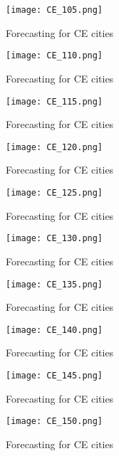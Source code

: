  \begin{figure}[!ht] 
 \centering 
 \texttt{[image: CE\_105.png]} 
 \caption{Forecasting for CE cities } 
 \label{fig:CE_105} 
 \end{figure} 
 
 \begin{figure}[!ht] 
 \centering 
 \texttt{[image: CE\_110.png]} 
 \caption{Forecasting for CE cities } 
 \label{fig:CE_110} 
 \end{figure} 
 
 \begin{figure}[!ht] 
 \centering 
 \texttt{[image: CE\_115.png]} 
 \caption{Forecasting for CE cities } 
 \label{fig:CE_115} 
 \end{figure} 
 
 \begin{figure}[!ht] 
 \centering 
 \texttt{[image: CE\_120.png]} 
 \caption{Forecasting for CE cities } 
 \label{fig:CE_120} 
 \end{figure} 
 
 \begin{figure}[!ht] 
 \centering 
 \texttt{[image: CE\_125.png]} 
 \caption{Forecasting for CE cities } 
 \label{fig:CE_125} 
 \end{figure} 
 
 \begin{figure}[!ht] 
 \centering 
 \texttt{[image: CE\_130.png]} 
 \caption{Forecasting for CE cities } 
 \label{fig:CE_130} 
 \end{figure} 
 
 \begin{figure}[!ht] 
 \centering 
 \texttt{[image: CE\_135.png]} 
 \caption{Forecasting for CE cities } 
 \label{fig:CE_135} 
 \end{figure} 
 
 \begin{figure}[!ht] 
 \centering 
 \texttt{[image: CE\_140.png]} 
 \caption{Forecasting for CE cities } 
 \label{fig:CE_140} 
 \end{figure} 
 
 \begin{figure}[!ht] 
 \centering 
 \texttt{[image: CE\_145.png]} 
 \caption{Forecasting for CE cities } 
 \label{fig:CE_145} 
 \end{figure} 
 
 \begin{figure}[!ht] 
 \centering 
 \texttt{[image: CE\_150.png]} 
 \caption{Forecasting for CE cities } 
 \label{fig:CE_150} 
 \end{figure} 
 
